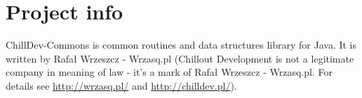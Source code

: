 %

\chapter{Project info}


ChillDev-Commons is common routines and data structures library for Java. It is written by Rafał Wrzeszcz - Wrzasq.pl (Chillout Development is not a legitimate company in meaning of law - it's a mark of Rafał Wrzeszcz - Wrzasq.pl. For details see \url{http://wrzasq.pl/} and \url{http://chilldev.pl/}).




